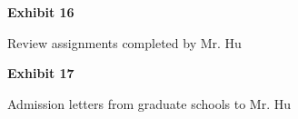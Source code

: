 \documentclass{article}
\begin{document}
\vspace*{\fill}
\begin{center}

{\LARGE \bf
Exhibit 16
}

\vspace{10\baselineskip}

{\large  Review assignments completed by Mr. Hu}

\end{center}
\vspace*{\fill}

% 

% 

% 

% 

% 

% 

% 

% 

% 

% 

% 

% 



\vspace*{\fill}
\begin{center}

{\LARGE \bf
Exhibit 17
}

\vspace{10\baselineskip}

{\large Admission letters from graduate schools to Mr. Hu}

\end{center}
\vspace*{\fill}
\end{document}
